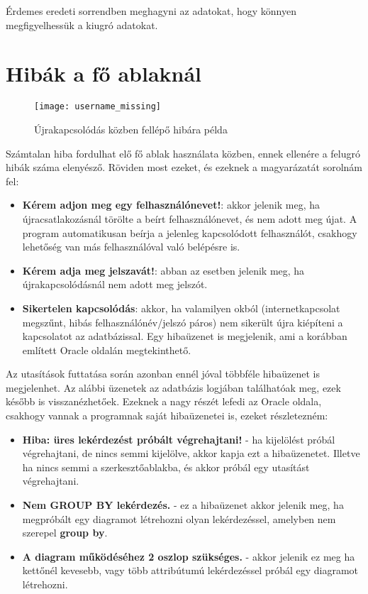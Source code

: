 Érdemes eredeti sorrendben meghagyni az adatokat, hogy könnyen megfigyelhessük a kiugró adatokat.

\section{Hibák a fő ablaknál}

\begin{figure}[ht]
  \begin{center}
  \texttt{[image: username\_missing]}
  \end{center}
 \caption{Újrakapcsolódás közben fellépő hibára példa}
\end{figure}

Számtalan hiba fordulhat elő fő ablak használata közben, ennek ellenére a felugró hibák száma elenyésző.
Röviden most ezeket, és ezeknek a magyarázatát sorolnám fel:

\begin{itemize}
  \item \textbf{Kérem adjon meg egy felhasználónevet!}: akkor jelenik meg, ha újracsatlakozásnál törölte a beírt felhasználónevet, és nem adott meg újat. A program automatikusan beírja a jelenleg kapcsolódott felhasználót, csakhogy lehetőség van más felhasználóval való belépésre is.
  \item \textbf{Kérem adja meg jelszavát!}: abban az esetben jelenik meg, ha újrakapcsolódásnál nem adott meg jelszót.
  \item \textbf{Sikertelen kapcsolódás}: akkor, ha valamilyen okból (internetkapcsolat megszűnt, hibás felhasználónév/jelszó páros) nem sikerült
  újra kiépíteni a kapcsolatot az adatbázissal. Egy hibaüzenet is megjelenik, ami a korábban említett Oracle oldalán\cite{oracledocs} megtekinthető.
\end{itemize}

Az utasítások futtatása során azonban ennél jóval többféle hibaüzenet is megjelenhet. Az alábbi üzenetek az adatbázis logjában találhatóak meg, ezek később is visszanézhetőek.
Ezeknek a nagy részét lefedi az Oracle oldala\cite{oracledocs}, csakhogy
vannak a programnak saját hibaüzenetei is, ezeket részletezném:

\begin{itemize}
  \item \textbf{Hiba: üres lekérdezést próbált végrehajtani!} - ha kijelölést próbál végrehajtani, de nincs semmi kijelölve, akkor kapja ezt a hibaüzenetet. Illetve ha
  nincs semmi a szerkesztőablakba, és akkor próbál egy utasítást végrehajtani.
  \item \textbf{Nem GROUP BY lekérdezés.} - ez a hibaüzenet akkor jelenik meg, ha megpróbált egy diagramot létrehozni olyan lekérdezéssel, amelyben nem szerepel \textbf{group by}.
  \item \textbf{A diagram működéséhez 2 oszlop szükséges.} - akkor jelenik ez meg ha kettőnél kevesebb, vagy több attribútumú lekérdezéssel próbál egy diagramot létrehozni.
\end{itemize}


